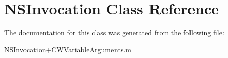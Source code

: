 \hypertarget{class_n_s_invocation}{\section{\-N\-S\-Invocation \-Class \-Reference}
\label{class_n_s_invocation}
}


\-The documentation for this class was generated from the following file\-:\begin{DoxyCompactItemize}
\item 
\-N\-S\-Invocation+\-C\-W\-Variable\-Arguments.\-m\end{DoxyCompactItemize}
